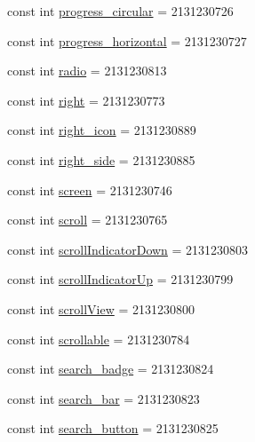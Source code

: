 \begin{CompactItemize}
\item 
const int \hyperlink{class__2doo_1_1_droid_1_1_resource_1_1_id_bf7950a3f81df8b68c2c8f715a1444af}{progress\_\-circular} = 2131230726
\item 
const int \hyperlink{class__2doo_1_1_droid_1_1_resource_1_1_id_5007f0ef32103c7e1f21e4827812f4d7}{progress\_\-horizontal} = 2131230727
\item 
const int \hyperlink{class__2doo_1_1_droid_1_1_resource_1_1_id_0520517a7f23a79ee81da23c60539d9c}{radio} = 2131230813
\item 
const int \hyperlink{class__2doo_1_1_droid_1_1_resource_1_1_id_56bd3af653eef17a7d03b6cbd524347e}{right} = 2131230773
\item 
const int \hyperlink{class__2doo_1_1_droid_1_1_resource_1_1_id_df7e39886ed0c5bf27b1b04edd9378b2}{right\_\-icon} = 2131230889
\item 
const int \hyperlink{class__2doo_1_1_droid_1_1_resource_1_1_id_d689d29827fb4b3f0aada1444963cc61}{right\_\-side} = 2131230885
\item 
const int \hyperlink{class__2doo_1_1_droid_1_1_resource_1_1_id_651c7e5f6b4690d2025beb1fabb3ab3b}{screen} = 2131230746
\item 
const int \hyperlink{class__2doo_1_1_droid_1_1_resource_1_1_id_001f6bf8715fd990bd20d62eb637475e}{scroll} = 2131230765
\item 
const int \hyperlink{class__2doo_1_1_droid_1_1_resource_1_1_id_f281a452d670f7ff2e2c706a6e651aa5}{scrollIndicatorDown} = 2131230803
\item 
const int \hyperlink{class__2doo_1_1_droid_1_1_resource_1_1_id_b721ba8f782f862979b59971d01852bb}{scrollIndicatorUp} = 2131230799
\item 
const int \hyperlink{class__2doo_1_1_droid_1_1_resource_1_1_id_3980aaa1655c615b2eb8d03bd13f38bb}{scrollView} = 2131230800
\item 
const int \hyperlink{class__2doo_1_1_droid_1_1_resource_1_1_id_db88cabb66d4888499eb29e3608da005}{scrollable} = 2131230784
\item 
const int \hyperlink{class__2doo_1_1_droid_1_1_resource_1_1_id_3c2f4ecf2b0f85124fbc675b37cbf34a}{search\_\-badge} = 2131230824
\item 
const int \hyperlink{class__2doo_1_1_droid_1_1_resource_1_1_id_a8e0a2126f8e17dc4a7d1bd305d7179d}{search\_\-bar} = 2131230823
\item 
const int \hyperlink{class__2doo_1_1_droid_1_1_resource_1_1_id_0fce900d3d7be421119b2e6e80041e42}{search\_\-button} = 2131230825
\item 

\end{CompactItemize}
